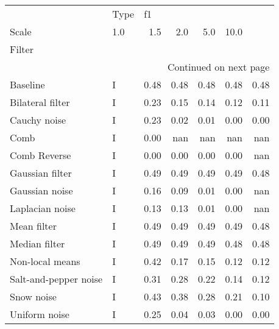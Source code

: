 \begin{longtable}{llrrrrr}
\toprule
{} & Type & \multicolumn{5}{l}{f1} \\
Scale &  1.0 &  1.5 &  2.0 &  5.0 & 10.0 \\
Filter                &      &      &      &      &      &      \\
\midrule
\endhead
\midrule
\multicolumn{7}{r}{{Continued on next page}} \\
\midrule
\endfoot

\bottomrule
\endlastfoot
Baseline              &    I & 0.48 & 0.48 & 0.48 & 0.48 & 0.48 \\
Bilateral filter      &    I & 0.23 & 0.15 & 0.14 & 0.12 & 0.11 \\
Cauchy noise          &    I & 0.23 & 0.02 & 0.01 & 0.00 & 0.00 \\
Comb                  &    I & 0.00 &  nan &  nan &  nan &  nan \\
Comb Reverse          &    I & 0.00 & 0.00 & 0.00 & 0.00 &  nan \\
Gaussian filter       &    I & 0.49 & 0.49 & 0.49 & 0.49 & 0.48 \\
Gaussian noise        &    I & 0.16 & 0.09 & 0.01 & 0.00 &  nan \\
Laplacian noise       &    I & 0.13 & 0.13 & 0.01 & 0.00 &  nan \\
Mean filter           &    I & 0.49 & 0.49 & 0.49 & 0.49 & 0.48 \\
Median filter         &    I & 0.49 & 0.49 & 0.49 & 0.48 & 0.48 \\
Non-local means       &    I & 0.42 & 0.17 & 0.15 & 0.12 & 0.12 \\
Salt-and-pepper noise &    I & 0.31 & 0.28 & 0.22 & 0.14 & 0.12 \\
Snow noise            &    I & 0.43 & 0.38 & 0.28 & 0.21 & 0.10 \\
Uniform noise         &    I & 0.25 & 0.04 & 0.03 & 0.00 & 0.00 \\
\end{longtable}
